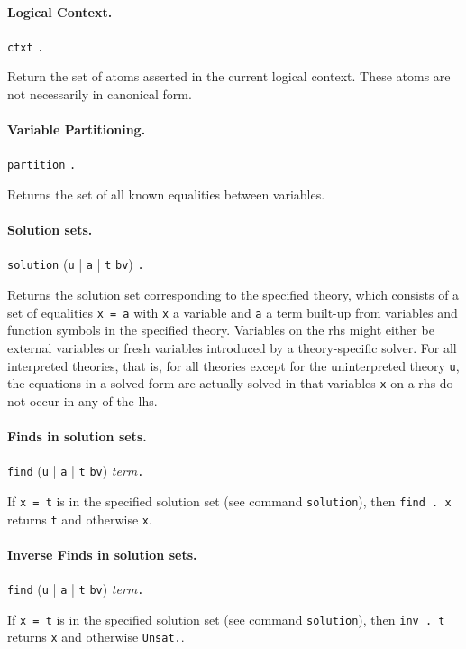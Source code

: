\documentclass[12pt]{article}
\newcommand{\term}{\textit{term}}
\begin{document}
\paragraph{Logical Context.}
  \begin{center}
  \texttt{ctxt}  \texttt{.}
  \end{center}
Return the set of atoms asserted in the current logical context.
These atoms are not necessarily in canonical form.

\paragraph{Variable Partitioning.}
  \begin{center}
  \texttt{partition}  \texttt{.}
  \end{center}
Returns the set of all known equalities between variables.

\paragraph{Solution sets.}
  \begin{center}
  \texttt{solution} (\texttt{u} | \texttt{a} | \texttt{t} \texttt{bv}) \texttt{.}
  \end{center}
Returns the solution set corresponding to the specified theory,
which consists of a set of equalities \texttt{x = a} with \texttt{x}
a variable and \texttt{a} a term built-up from variables and function
symbols in the specified theory.  Variables on the rhs might either be
external variables or fresh variables introduced by a theory-specific solver.
For all interpreted theories, that is, for all theories except for the 
uninterpreted theory \texttt{u}, the equations in a solved form are 
actually solved in that variables \texttt{x} on a rhs do not occur in any 
of the lhs. 

\paragraph{Finds in solution sets.}
  \begin{center}
  \texttt{find} (\texttt{u} | \texttt{a} | \texttt{t} \texttt{bv}) \term \texttt{.}
  \end{center}
If \texttt{x = t} is in the specified solution set (see command \texttt{solution}),
then \texttt{find . x} returns \texttt{t} and otherwise \texttt{x}.

\paragraph{Inverse Finds in solution sets.}
  \begin{center}
  \texttt{find} (\texttt{u} | \texttt{a} | \texttt{t} \texttt{bv}) \term \texttt{.}
  \end{center}
If \texttt{x = t} is in the specified solution set (see command \texttt{solution}),
then \texttt{inv . t} returns \texttt{x} and otherwise \texttt{Unsat.}\@.
\end{document}
